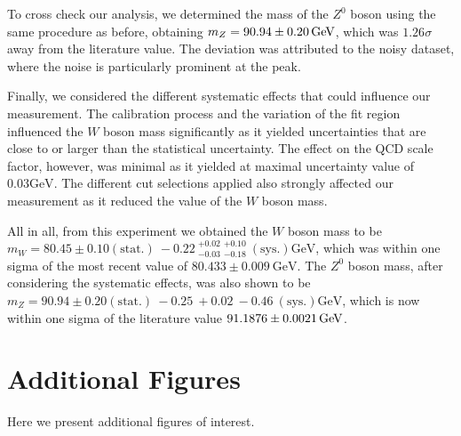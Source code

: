 \documentclass[a4paper]{report}
\numberwithin{equation}{section}
\begin{document}
To cross check our analysis, we determined the mass of the $Z^0$ boson using the same procedure as before, obtaining 
$m_Z = \SI{90.94 \pm 0.20}{\giga\electronvolt}$, which was $1.26\sigma$ away from the literature value. The deviation was attributed 
to the noisy dataset, where the noise is particularly prominent at the peak. \par 

Finally, we considered the different systematic effects that could influence our measurement. The calibration process and the 
variation of the fit region influenced the $W$ boson mass significantly as it yielded uncertainties that are close to or larger 
than the statistical uncertainty. The effect on the QCD scale factor, however, was minimal as it yielded at maximal 
uncertainty value of $0.03 \si{\giga\electronvolt}$. The different cut selections applied also strongly affected our measurement 
as it reduced the value of the $W$ boson mass. \par 

All in all, from this experiment we obtained the $W$ boson mass to be $m_W = 80.45 \pm 0.10 (\mathrm{stat.}) \: -0.22 \: 
^{+0.02}_{-0.03} \: ^{+0.10}_{-0.18} \: (\mathrm{sys.}) \si{\giga\electronvolt}$, which was within one sigma of the most recent 
value of  $80.433 \pm 0.009 \ \text{GeV}$. The $Z^0$ boson mass, after considering the systematic effects, was also shown to be $m_Z = 90.94 \pm 0.20 (\mathrm{stat.}) \: 
-0.25 \: + 0.02 \: -0.46 \: (\mathrm{sys.}) \si{\giga\electronvolt}$, which is now within one sigma of the literature value 
$\SI{91.1876 \pm 0.0021}{\giga\electronvolt}$. 

\printbibliography

\appendix

\chapter{Additional Figures} \label{chap:appendix_figs}

Here we present additional figures of interest.
\end{document}
